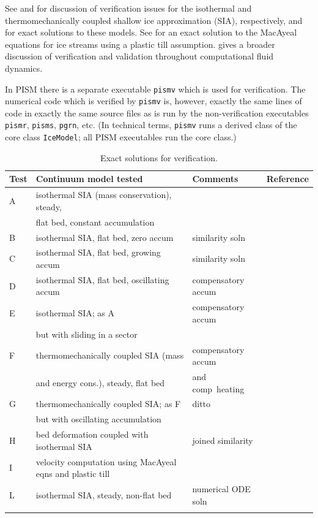 \documentclass[11pt,final]{amsart}
\begin{document}
See \cite{BLKCB} and \cite{BBL} for discussion of verification issues for the isothermal and thermomechanically coupled shallow ice approximation (SIA), respectively, and for exact solutions to these models.  See \cite{SchoofStream} for an exact solution to the MacAyeal equations for ice streams using a plastic till assumption.  \cite{Roache} gives a broader discussion of verification and validation throughout computational fluid dynamics.

In PISM there is a separate executable \verb|pismv| which is used for verification.  The numerical code which is verified by \verb|pismv| is, however, exactly the same lines of code in exactly the same source files as is run by the non-verification executables \verb|pismr|, \verb|pisms|, \verb|pgrn|, etc.  (In technical terms, \verb|pismv| runs a derived class of the core class \verb|IceModel|; all PISM executables run the core class.)

\begin{table}[h]
\caption{Exact solutions for verification.}\label{tab:tests}
\small
\begin{tabular}{@{}llll}\hline
\textbf{Test} & \textbf{Continuum model tested} & \textbf{Comments} & \textbf{Reference} \\ \hline
A & isothermal SIA (mass conservation), steady, &  & \cite{BLKCB} \\
 & flat bed, constant accumulation &  &  \\
B & isothermal SIA, flat bed, zero accum & similarity soln & \cite{BLKCB} \\
C & isothermal SIA, flat bed, growing accum & similarity soln & \cite{BLKCB} \\
D & isothermal SIA, flat bed, oscillating accum & compensatory accum & \cite{BLKCB} \\
E & isothermal SIA; as A &  compensatory accum & \cite{BLKCB} \\
 & but with sliding in a sector &  &  \\
F & thermomechanically coupled SIA (mass &  compensatory accum & \cite{BB,BBL} \\
 & and energy cons.), steady, flat bed & and comp~heating &  \\
G & thermomechanically coupled SIA; as F  & ditto & \cite{BB,BBL} \\
 & but with oscillating accumulation &  &  \\
H & bed deformation coupled with isothermal SIA & joined similarity & \cite{BLKfastearth} \\
I & velocity computation using MacAyeal eqns and plastic till &  & \cite{MacAyeal,SchoofStream} \\
L & isothermal SIA, steady, non-flat bed & numerical ODE soln & \cite{BuelerEquilSheets} \\
\hline
\normalsize
\end{tabular}
\end{table}
\end{document}
